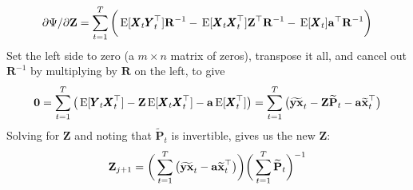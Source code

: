 \documentclass[]{article}
\def\ZZ{\mbox{$\mathbf Z$}}	\def\zz{\mbox{$\mathbf z$}}
\def\PP{\mbox{$\mathbf P$}}  \def\pp{\mbox{$\mathbf p$}}
\def\RR{\mbox{$\mathbf R$}}	 \def\rr{\mbox{$\mathbf r$}}
\def\XX{\mbox{$\pmb{X}$}}	\def\xx{\mbox{$\pmb{x}$}}
\def\YY{\mbox{$\pmb{Y}$}}	\def\yy{\mbox{$\pmb{y}$}}
\def\E{\,\textup{\textrm{E}}}
\def\hatxt{\widetilde{\mbox{$\mathbf x$}}_t}
\def\hatYXt{\widetilde{\mbox{$\mathbf{y}\mathbf{x}$}}_t}
\def\hatPt{\widetilde{\PP}_t}
\begin{document}
\begin{equation}\label{eq:Z.unconstrained3}
\begin{split}
&\partial\Psi/\partial\ZZ =  \sum_{t=1}^T\bigg(\E[ \XX_t \YY_t^\top]\RR^{-1} 
- \E[ \XX_t\XX_t^\top ]\ZZ^\top\RR^{-1}  -\E[ \XX_t ]\aa^\top\RR^{-1} \bigg) \\
\end{split}
\end{equation}
Set the left side to zero (a $m \times n$ matrix of zeros), transpose it all, and cancel out $\RR^{-1}$ by multiplying by $\RR$ on the left, to give
\begin{equation}\label{eq:Z.unconstrained4}
\begin{split}
\mathbf{0}  =  \sum_{t=1}^T\big(\E[\YY_t\XX_t^\top] - \ZZ \E[\XX_t\XX_t^\top] - \aa\E[\XX_t^\top]\big) 
 =  \sum_{t=1}^T \big( \hatYXt  - \ZZ \hatPt - \aa\hatxt^\top \big)
\end{split}
\end{equation}
Solving for $\ZZ$ and noting that $\hatPt$ is invertible, gives us the new $\ZZ$: 
\begin{equation}\label{eq:Z.update.unconstrained}
\ZZ_{j+1}= \bigg( \sum_{t=1}^T \big(\hatYXt - \aa\hatxt^\top\big)\bigg) \bigg(\sum_{t=1}^T \hatPt\bigg)^{-1}
\end{equation}
\end{document}
